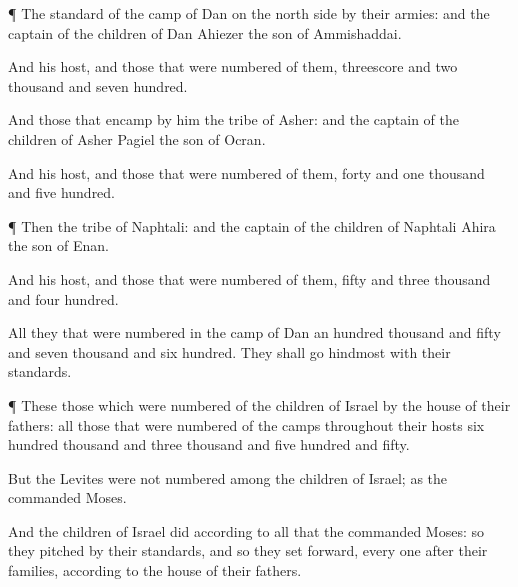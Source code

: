 {\par }{\PP {}¶ The
standard of the
camp of
Dan
{} on the north
side by their
armies: and the
captain of the
children of
Dan
{}
Ahiezer the
son of
Ammishaddai.

And his
host, and those that were
numbered of them,
{}
threescore and
two
thousand and
seven
hundred.

And those that
encamp by him
{} the
tribe of
Asher: and the
captain of the
children of
Asher
{}
Pagiel the
son of
Ocran.

And his
host, and those that were
numbered of them,
{}
forty and
one
thousand and
five
hundred.


\par }{\PP {}¶ Then the
tribe of
Naphtali: and the
captain of the
children of
Naphtali
{}
Ahira the
son of
Enan.

And his
host, and those that were
numbered of them,
{}
fifty and
three
thousand and
four
hundred.

All they that were
numbered in the
camp of
Dan
{} an
hundred
thousand and
fifty and
seven
thousand and
six
hundred. They shall
go
hindmost with their
standards.


\par }{\PP {}¶ These
{} those which were
numbered of the
children of
Israel by the
house of their
fathers: all those that were
numbered of the
camps throughout their
hosts
{}
six
hundred
thousand and
three
thousand and
five
hundred and
fifty.

But the
Levites were not
numbered
among the
children of
Israel; as the
{}
commanded
Moses.

And the
children of
Israel
did according to all that the
{}
commanded
Moses: so they
pitched by their
standards, and so they set
forward, every
one after their
families, according to the
house of their
fathers.




\par }
